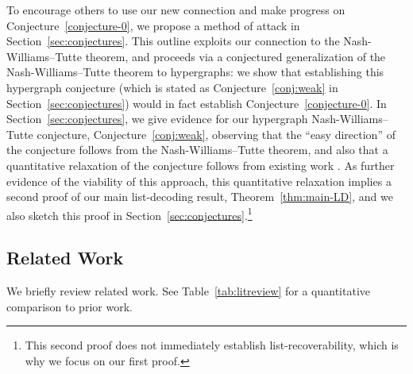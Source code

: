 \documentclass[11pt]{article}
\newcommand{\ryl}[1]{{\color{red} {\small [Ray: #1]}}}
\newcommand{\mkw}[1]{{\color{orange}{\small [Mary: #1]}}}
\begin{document}
To encourage others to use our new connection and make progress on Conjecture~\ref{conjecture-0}, we propose a method of attack in Section~\ref{sec:conjectures}.  This outline exploits our connection to the Nash-Williams--Tutte theorem, and proceeds via a conjectured generalization of the Nash-Williams--Tutte theorem to hypergraphs: we show that establishing this hypergraph conjecture (which is stated as Conjecture~\ref{conj:weak} in Section~\ref{sec:conjectures}) would in fact establish Conjecture~\ref{conjecture-0}. In Section~\ref{sec:conjectures}, we give evidence for our hypergraph Nash-Williams--Tutte conjecture, Conjecture~\ref{conj:weak}, observing that the ``easy direction'' of the conjecture follows from the Nash-Williams--Tutte theorem, and also that a quantitative relaxation of the conjecture follows from existing work \cite{CS07, CCV09}.
As further evidence of the viability of this approach, this quantitative relaxation implies a second proof of our main list-decoding result, Theorem~\ref{thm:main-LD}, and we also sketch this proof in Section~\ref{sec:conjectures}.\footnote{This second proof does not immediately establish list-recoverability, which is why we focus on our first proof.}







\subsection{Related Work}\label{sec:related}
We briefly review related work.  See Table~\ref{tab:litreview} for a quantitative comparison to prior work.
\end{document}
